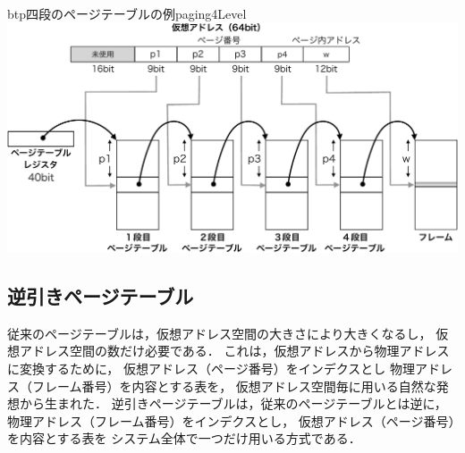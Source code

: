 \begin{myfig}{btp}{四段のページテーブルの例}{paging4Level}
  \includegraphics[scale=0.5]{Fig/paging4Level-crop.pdf}
\end{myfig}

\subsection{逆引きページテーブル}
従来のページテーブルは，仮想アドレス空間の大きさにより大きくなるし，
仮想アドレス空間の数だけ必要である．
これは，仮想アドレスから物理アドレスに変換するために，
仮想アドレス（ページ番号）をインデクスとし
物理アドレス（フレーム番号）を内容とする表を，
仮想アドレス空間毎に用いる自然な発想から生まれた．
逆引きページテーブルは，従来のページテーブルとは逆に，
物理アドレス（フレーム番号）をインデクスとし，
仮想アドレス（ページ番号）を内容とする表を
システム全体で一つだけ用いる方式である．

